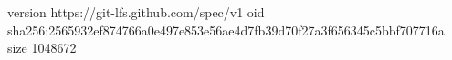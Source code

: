 version https://git-lfs.github.com/spec/v1
oid sha256:2565932ef874766a0e497e853e56ae4d7fb39d70f27a3f656345c5bbf707716a
size 1048672
